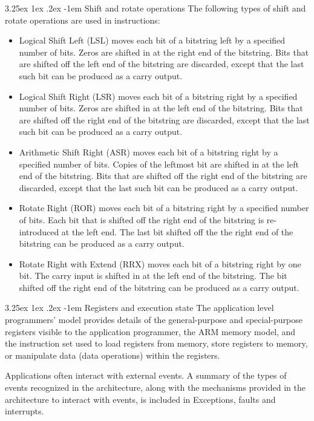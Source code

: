 \documentclass{report}
\makeatletter
\renewcommand\paragraph{\@startsection{paragraph}{5}{\z@}%
	{3.25ex \@plus1ex \@minus.2ex}%
	{-1em}%
	{\normalfont\normalsize\bfseries}}
\makeatother
\begin{document}
		\paragraph{Shift and rotate operations} The following types of shift and rotate operations are used in instructions:
		\begin{itemize}
			\item Logical Shift Left (LSL) moves each bit of a bitstring left by a specified number of bits. Zeros are shifted in at the right end of the bitstring. Bits that are shifted off the left end of the bitstring are discarded, except that the last such bit can be produced as a carry output.
			\item Logical Shift Right (LSR) moves each bit of a bitstring right by a specified number of bits. Zeros are shifted in at the left end of the bitstring. Bits that are shifted off the right end of the bitstring are discarded, except that the last such bit can be produced as a carry output.
			\item Arithmetic Shift Right (ASR) moves each bit of a bitstring right by a specified number of bits. Copies of the leftmost bit are shifted in at the left end of the bitstring. Bits that are shifted off the right end of the bitstring are discarded, except that the last such bit can be produced as a carry output.
			\item Rotate Right (ROR) moves each bit of a bitstring right by a specified number of bits. Each bit that is shifted off the right end of the bitstring is re-introduced at the left end. The last bit shifted off the the right end of the bitstring can be produced as a carry output.
			\item Rotate Right with Extend (RRX) moves each bit of a bitstring right by one bit. The carry input is shifted in at the left end of the bitstring. The bit shifted off the right end of the bitstring can be produced as a carry output.
		\end{itemize}
		
		\paragraph{Registers and execution state} The application level programmers’ model provides details of the general-purpose and special-purpose registers visible to the application programmer, the ARM memory model, and the instruction set used to load registers from memory, store registers to memory, or manipulate data (data operations) within the registers.
		\par Applications often interact with external events. A summary of the types of events recognized in the architecture, along with the mechanisms provided in the architecture to interact with events, is included in Exceptions, faults and interrupts. 
		
\end{document}
